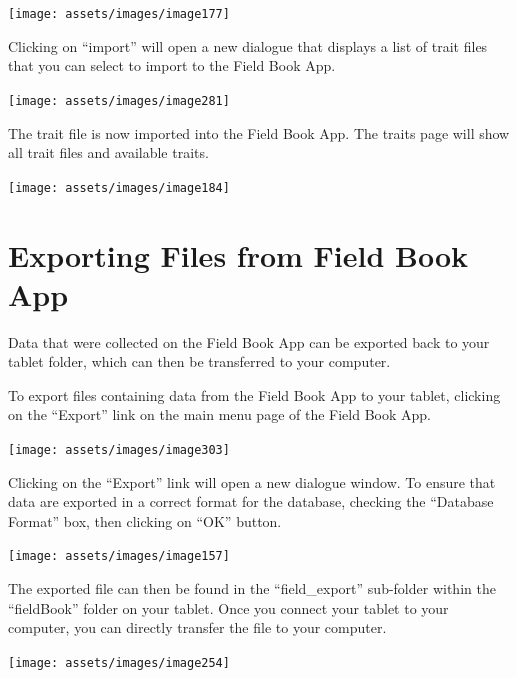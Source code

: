 \documentclass[
  12pt,
]{book}
\begin{document}
\begin{center}\texttt{[image: assets/images/image177]} \end{center}

Clicking on ``import'' will open a new dialogue that displays a list of trait files that you can select to import to the Field Book App.

\begin{center}\texttt{[image: assets/images/image281]} \end{center}

The trait file is now imported into the Field Book App. The traits page will show all trait files and available traits.

\begin{center}\texttt{[image: assets/images/image184]} \end{center}

\hypertarget{exporting-files-from-field-book-app}{%
\section{Exporting Files from Field Book App}\label{exporting-files-from-field-book-app}}

Data that were collected on the Field Book App can be exported back to your tablet folder, which can then be transferred to your computer.

To export files containing data from the Field Book App to your tablet, clicking on the ``Export'' link on the main menu page of the Field Book App.

\begin{center}\texttt{[image: assets/images/image303]} \end{center}

Clicking on the ``Export'' link will open a new dialogue window. To ensure that data are exported in a correct format for the database, checking the ``Database Format'' box, then clicking on ``OK'' button.

\begin{center}\texttt{[image: assets/images/image157]} \end{center}

The exported file can then be found in the ``field\_export'' sub-folder within the ``fieldBook'' folder on your tablet. Once you connect your tablet to your computer, you can directly transfer the file to your computer.

\begin{center}\texttt{[image: assets/images/image254]} \end{center}
\end{document}
